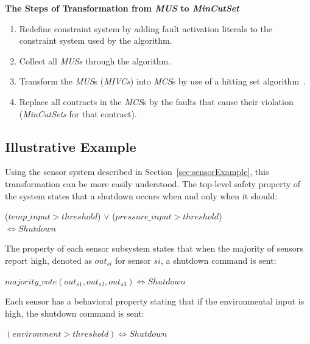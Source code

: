 \textbf{The Steps of Transformation from \textit{MUS} to \textit{MinCutSet}}
\begin{enumerate}
\item Redefine constraint system by adding fault activation literals to the constraint system used by the \aivcalg algorithm. %
\item Collect all \textit{MUSs} through the \aivcalg algorithm.
\item Transform the \textit{MUS}s (\textit{MIVCs}) into \textit{MCS}s by use of a hitting set algorithm~\cite{murakami2013efficient,gainer2017minimal}. 
\item Replace all contracts in the \textit{MCS}s by the faults that cause their violation (\textit{MinCutSets} for that contract). 
\end{enumerate}

\subsection{Illustrative Example}
Using the sensor system described in Section~\ref{sec:sensorExample}, this transformation can be more easily understood. The top-level safety property of the system states that a shutdown occurs when and only when it should: 
\begin{center}
    ($temp\_input > threshold$) $\lor$ ($pressure\_input > threshold$)\\
    $\iff Shutdown$
    
\end{center}

The property of each sensor subsystem states that when the majority of sensors report high, denoted as $out_{si}$ for sensor $si$, a shutdown command is sent:
\begin{center}
    $majority\_vote(out_{s1}, out_{s2}, out_{s3}) \iff Shutdown$
    
\end{center}

Each sensor has a behavioral property stating that if the environmental input is high, the shutdown command is sent: 
\begin{center}
    $(environment > threshold) \iff Shutdown$
    
\end{center}

